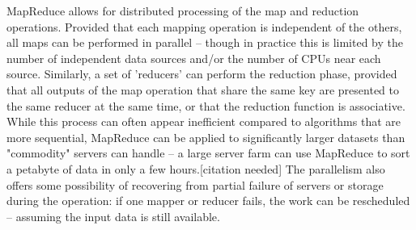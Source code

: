 \documentclass{article} %
\begin{document}
	MapReduce allows for distributed processing of the map and reduction operations. Provided that each mapping operation is independent of the others, all maps can be performed in parallel – though in practice this is limited by the number of independent data sources and/or the number of CPUs near each source. Similarly, a set of 'reducers' can perform the reduction phase, provided that all outputs of the map operation that share the same key are presented to the same reducer at the same time, or that the reduction function is associative. While this process can often appear inefficient compared to algorithms that are more sequential, MapReduce can be applied to significantly larger datasets than "commodity" servers can handle – a large server farm can use MapReduce to sort a petabyte of data in only a few hours.[citation needed] The parallelism also offers some possibility of recovering from partial failure of servers or storage during the operation: if one mapper or reducer fails, the work can be rescheduled – assuming the input data is still available.
\end{document}
